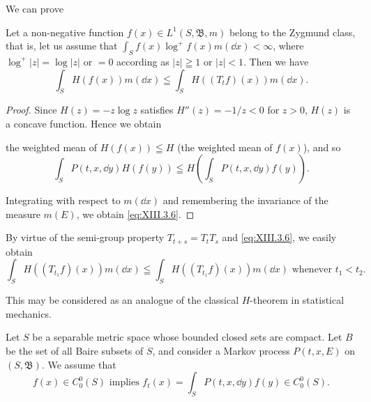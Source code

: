 \begin{enumerate}[1.]
We can prove 

\begin{theoremn} Let a non-negative function $f(x) \in L^{1}(S, \mathfrak{B}, m)$ belong to the Zygmund class, that is, let us assume that $\int_{S} f(x) \log^{+} f(x) m(\dd x) < \infty$, where $\log^{+}|z| = \log |z|$ or $= 0$ according as $|z| \geqq 1$ or $|z| < 1$. Then we have
\begin{equation}\label{eq:XIII.3.6}
\int_{S} H (f (x)) m (\dd x) \leqq \int_{S} H ((T _{t} f) (x)) m (\dd x).
\end{equation}

\end{theoremn}
\begin{proof}
 Since $H(z) = -z \log z$ satisfies $H''(z) = -1/z < 0$ for $z > 0$, $H(z)$ is a concave function. Hence we obtain 

the weighted mean of $H(f(x)) \leqq H$ (the weighted mean of $f(x)$), and so 
\[
\int_{S} P (t, x, \dd y) H (f (y)) \leqq H \left(\int_{S} P (t, x, \dd y) f (y)\right). \]

Integrating with respect to $m(\dd x)$ and remembering the invariance of the measure $m(E)$, we obtain \eqref{eq:XIII.3.6}. 
\end{proof}

\begin{remarku} By virtue of the semi-group property $T_{t+s} = T_t T_s$ and \eqref{eq:XIII.3.6}, we easily obtain 
\begin{equation}\tag{6'}\label{eq:XIII.3.6'}
\int_{S} H \left(\left(T _ {t _{1}} f\right) (x)\right) m (\dd x) \leqq \int_{S} H \left(\left(T _ {t _{1}} f\right) (x)\right) m (\dd x) \text{ whenever } t _{1} < t _{2}.
\end{equation}
\end{remarku}

This may be considered as an analogue of the classical $H$-theorem in statistical mechanics. 


\end{enumerate}

\label{sec:XIII.4}

Let $S$ be a separable metric space whose bounded closed sets are compact. Let $B$ be the set of all Baire subsets of $S$, and consider a Markov process $P(t, x, E)$ on $(S, \mathfrak{B})$. We assume that 
\begin{equation}\label{eq:XIII.4.1}
f (x) \in C _{0} ^{0} (S) \text{ implies } f _{t} (x) = \int_{S} P (t, x, \dd y) f (y) \in C _{0} ^{0} (S).
\end{equation}

